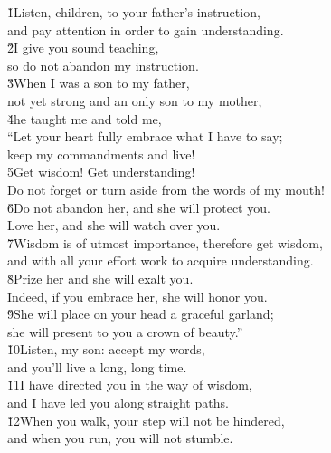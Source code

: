 \begin{poetry}
\poeml {}
\v{1}Listen, children, to your father's instruction, \\
\poeml and pay attention in order to gain understanding. \\
\poeml \v{2}I give you sound teaching, \\
\poeml so do not abandon my instruction. \\
\poeml \v{3}When I was a son to my father, \\
\poemll    not yet strong and an only son to my mother, \\
\poeml \v{4}he taught me and told me, \\
\poemll    ``Let your heart fully embrace what I have to say; \\
\poemlll       keep my commandments and live! \\
\poeml \v{5}Get wisdom! Get understanding! \\
\poemll    Do not forget or turn aside from the words of my mouth! \\
\poeml \v{6}Do not abandon her, and she will protect you. \\
\poemll    Love her, and she will watch over you. \\
\poeml \v{7}Wisdom is of utmost importance, therefore get wisdom, \\
\poemll    and with all your effort work to acquire understanding. \\
\poeml \v{8}Prize her and she will exalt you. \\
\poemll    Indeed, if you embrace her, she will honor you. \\
\poeml \v{9}She will place on your head a graceful garland; \\
\poemll    she will present to you a crown of beauty.'' \\
\poeml \v{10}Listen, my son: accept my words, \\
\poemll    and you'll live a long, long time. \\
\poeml \v{11}I have directed you in the way of wisdom, \\
\poemll    and I have led you along straight paths. \\
\poeml \v{12}When you walk, your step will not be hindered, \\
\poemll    and when you run, you will not stumble. \\

\end{poetry}

